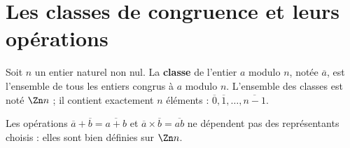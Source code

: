 \section{Les classes de congruence et leurs opérations}

\begin{definition}
Soit $n$ un entier naturel non nul. La \textbf{classe} de l'entier $a$ modulo
$n$, notée $\overline a$, est l'ensemble de tous les entiers congrus à $a$
modulo $n$. L'ensemble des classes est noté $\Zn n$ ; il contient exactement
$n$ éléments : $\overline 0, \overline 1, \dots, \overline{n-1}$.
\end{definition}

\begin{propriete}[opérations]
Les opérations $\overline a+\overline b = \overline{a+b}$ et
$\overline a \times \overline b = \overline{ab}$ ne dépendent pas des
représentants choisis : elles sont bien définies sur $\Zn n$.
\end{propriete}

